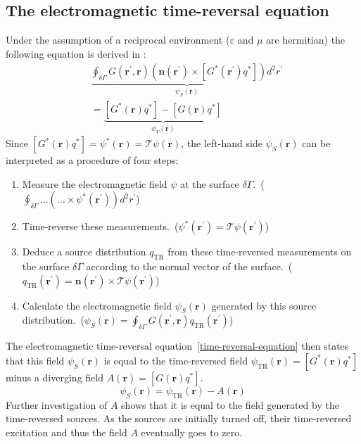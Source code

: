 \subsection{The electromagnetic time-reversal equation}
Under the assumption of a reciprocal environment (\(\varepsilon \) and \(\mu \) are hermitian) the following equation is derived in \parencite{de_rosny_theory_2010}:
\begin{equation}\label{time-reversal-equation}
    \begin{aligned}
    & \underbrace{\oint_{\delta \Gamma} G(\bm{r}^{\prime}, \bm{r})\left(\bm{n}\left(\bm{r}^{\prime}\right) \times\left[G^*\left(\bm{r}^{\prime}\right) q^*\right]\right) d^2 r^{\prime}}_{\psi_S(\bm{r})} \\
    &=\underbrace{[G^*(\bm{r}) q^*] - [G(\bm{r}) q^*]}_{\psi_V(\bm{r})}
    \end{aligned}
\end{equation}
Since \([G^*(\bm{r}) q^*] = \psi^*(\bm{r}) = \mathcal{T}\psi(\bm{r})\), the left-hand side \(\psi_S(\bm{r})\) can be interpreted as a procedure of four steps:
\begin{enumerate}
    \item Measure the electromagnetic field \(\psi \) at the surface \(\delta \Gamma \).\ (\(\oint_{\delta \Gamma} \ldots  (\ldots \times \psi^*(\bm{r}^{\prime})) d^2 r^{\prime}\))
    \item Time-reverse these measurements.\ (\(\psi^*(\bm{r}^{\prime}) = \mathcal{T}\psi(\bm{r}^{\prime})\))
    \item Deduce a source distribution \(q_{\text{TR}}\) from these time-reversed measurements on the surface \(\delta \Gamma \) according to the normal vector of the surface.\ (\(q_{\text{TR}}(\bm{r}^{\prime}) = \bm{n}(\bm{r}^{\prime}) \times \mathcal{T}\psi(\bm{r}^{\prime})\))
    \item Calculate the electromagnetic field \(\psi_S(\bm{r})\) generated by this source distribution.\ (\(\psi_S(\bm{r}) = \oint_{\delta \Gamma} G(\bm{r}^{\prime}, \bm{r}) q_{\text{TR}}(\bm{r}^{\prime})\))
\end{enumerate}
The electromagnetic time-reversal equation~\eqref{time-reversal-equation} then states that this field \(\psi_S(\bm{r})\) is equal to the time-reversed field \(\psi_{\text{TR}}(\bm{r}) = [G^*(\bm{r}) q^*]\) minus a diverging field \(A(\bm{r}) = [G(\bm{r}) q^*]\).
\begin{equation}
    \psi_S(\bm{r}) = \psi_{\text{TR}}(\bm{r}) - A(\bm{r})
\end{equation}
Further investigation of \(A\) shows that it is equal to the field generated by the time-reversed sources.
As the sources are initially turned off, their time-reversed excitation and thus the field \(A\) eventually goes to zero.


